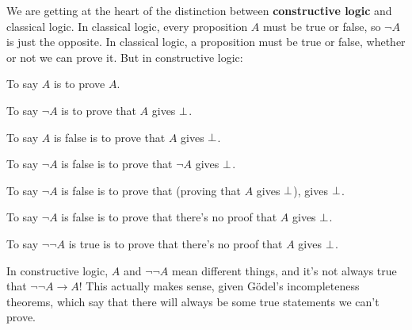 \documentclass[11pt,paper=letter]{scrartcl}
\renewcommand{\lnot}{\neg}
\begin{document}
We are getting at the heart of the distinction between \textbf{constructive logic} and classical logic. In classical logic, every proposition $A$ must be true or false, so $\lnot A$ is just the opposite. In classical logic, a proposition must be true or false, whether or not we can prove it. But in constructive logic:
\begin{itemthin}
\item To say $A$ is to prove $A$.
\item To say $\lnot A$ is to prove that $A$ gives $\bot$.
\item To say $A$ is false is to prove that $A$ gives $\bot$.
\item To say $\lnot A$ is false is to prove that $\lnot A$ gives $\bot$.
\item To say $\lnot A$ is false is to prove that (proving that $A$ gives $\bot$), gives $\bot$.
\item To say $\lnot A$ is false is to prove that there's no proof that $A$ gives $\bot$.
\item To say $\lnot \lnot A$ is true is to prove that there's no proof that $A$ gives $\bot$.
\end{itemthin}
In constructive logic, $A$ and $\lnot\lnot A$ mean different things, and it's not always true that $\lnot\lnot A \to A$! This actually makes sense, given Gödel's incompleteness theorems, which say that there will always be some true statements we can't prove.
\end{document}
